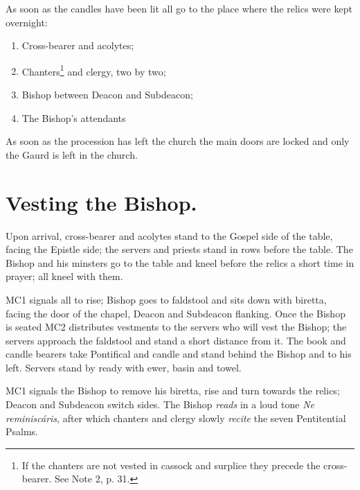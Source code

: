 \documentclass[letterpaper]{report}
\begin{document}
{    \rubric As soon as the candles have been lit all go to the place where the
    relics were kept overnight:

    \begin{enumerate}

        \item Cross-bearer and acolytes;

        \item Chanters\footnote{If the chanters are not vested in cassock and
            surplice they precede the cross-bearer. See \cite{consecranda} Note
            2, p. 31.} and clergy, two by two;

        \item Bishop between Deacon and Subdeacon;

        \item The Bishop's attendants

    \end{enumerate}

    As soon as the procession has left the church the main doors are locked and
    only the Gaurd is left in the church.

    \section{Vesting the Bishop.}

    \rubric Upon arrival, cross-bearer and acolytes stand to the Gospel side of
    the table, facing the Epistle side; the servers and priests stand in rows
    before the table. The Bishop and his minsters
    go to the table and kneel before the relics a short time in prayer; all
    kneel with them.

    \rubric MC1 signals all to rise; Bishop goes to faldstool and sits down
    with biretta, facing the door of the chapel, Deacon and Subdeacon flanking.
    Once the Bishop is seated MC2 distributes vestments to the servers who will
    vest the Bishop; the servers approach the faldstool and stand a short
    distance from it. The book and candle bearers take Pontifical and candle
    and stand behind the Bishop and to his left. Servers stand by ready with
    ewer, basin and towel.

    \rubric MC1 signals the Bishop to remove his biretta, rise and turn towards
    the relics; Deacon and Subdeacon switch sides. The Bishop \textit{reads} in
    a loud tone \textit{Ne reminisc\'aris}, after which chanters and clergy
    slowly \textit{recite} the seven Pentitential Psalms.

}
\end{document}
